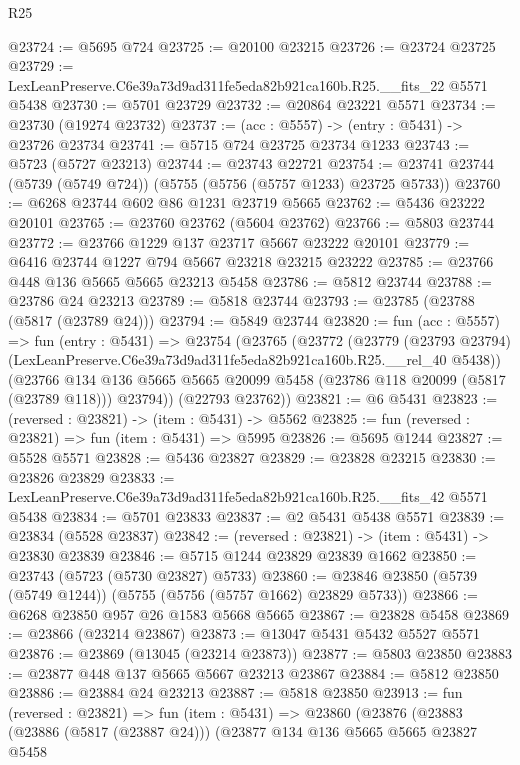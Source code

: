 \begin{lexlean}{R25}
\begin{coremodule}
@23724 := @5695 @724
@23725 := @20100 @23215
@23726 := @23724 @23725
@23729 := LexLeanPreserve.C6e39a73d9ad311fe5eda82b921ca160b.R25.__fits_22 @5571 @5438
@23730 := @5701 @23729
@23732 := @20864 @23221 @5571
@23734 := @23730 (@19274 @23732)
@23737 := (acc : @5557) -> (entry : @5431) -> @23726 @23734
@23741 := @5715 @724 @23725 @23734 @1233
@23743 := @5723 (@5727 @23213)
@23744 := @23743 @22721
@23754 := @23741 @23744 (@5739 (@5749 @724)) (@5755 (@5756 (@5757 @1233) @23725 @5733))
@23760 := @6268 @23744 @602 @86 @1231 @23719 @5665
@23762 := @5436 @23222 @20101
@23765 := @23760 @23762 (@5604 @23762)
@23766 := @5803 @23744
@23772 := @23766 @1229 @137 @23717 @5667 @23222 @20101
@23779 := @6416 @23744 @1227 @794 @5667 @23218 @23215 @23222
@23785 := @23766 @448 @136 @5665 @5665 @23213 @5458
@23786 := @5812 @23744
@23788 := @23786 @24 @23213
@23789 := @5818 @23744
@23793 := @23785 (@23788 (@5817 (@23789 @24)))
@23794 := @5849 @23744
@23820 := fun (acc : @5557) =>
  fun (entry : @5431) =>
  @23754
    (@23765
      (@23772
        (@23779
          (@23793 @23794)
          (LexLeanPreserve.C6e39a73d9ad311fe5eda82b921ca160b.R25.__rel_40 @5438))
        (@23766
          @134
          @136
          @5665
          @5665
          @20099
          @5458
          (@23786 @118 @20099 (@5817 (@23789 @118)))
          @23794))
      (@22793 @23762))
@23821 := @6 @5431
@23823 := (reversed : @23821) -> (item : @5431) -> @5562
@23825 := fun (reversed : @23821) => fun (item : @5431) => @5995
@23826 := @5695 @1244
@23827 := @5528 @5571
@23828 := @5436 @23827
@23829 := @23828 @23215
@23830 := @23826 @23829
@23833 := LexLeanPreserve.C6e39a73d9ad311fe5eda82b921ca160b.R25.__fits_42 @5571 @5438
@23834 := @5701 @23833
@23837 := @2 @5431 @5438 @5571
@23839 := @23834 (@5528 @23837)
@23842 := (reversed : @23821) -> (item : @5431) -> @23830 @23839
@23846 := @5715 @1244 @23829 @23839 @1662
@23850 := @23743 (@5723 (@5730 @23827) @5733)
@23860 := @23846 @23850 (@5739 (@5749 @1244)) (@5755 (@5756 (@5757 @1662) @23829 @5733))
@23866 := @6268 @23850 @957 @26 @1583 @5668 @5665
@23867 := @23828 @5458
@23869 := @23866 (@23214 @23867)
@23873 := @13047 @5431 @5432 @5527 @5571
@23876 := @23869 (@13045 (@23214 @23873))
@23877 := @5803 @23850
@23883 := @23877 @448 @137 @5665 @5667 @23213 @23867
@23884 := @5812 @23850
@23886 := @23884 @24 @23213
@23887 := @5818 @23850
@23913 := fun (reversed : @23821) =>
  fun (item : @5431) =>
  @23860
    (@23876
      (@23883
        (@23886 (@5817 (@23887 @24)))
        (@23877
          @134
          @136
          @5665
          @5665
          @23827
          @5458

\end{coremodule}
\end{lexlean}
